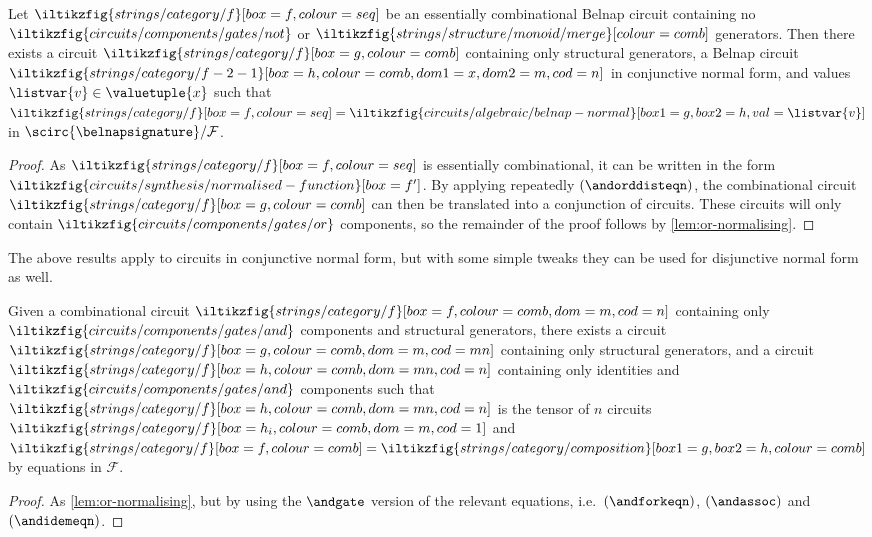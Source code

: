 \begin{proposition}\label{prop:conjunctive-normal-form}
    Let \(
    \iltikzfig{strings/category/f}[box=f,colour=seq]
    \) be an essentially combinational Belnap circuit containing no \(
    \iltikzfig{circuits/components/gates/not}
    \) or \(
    \iltikzfig{strings/structure/monoid/merge}[colour=comb]
    \) generators.
    Then there exists a circuit \(
    \iltikzfig{strings/category/f}[box=g,colour=comb]
    \) containing only structural generators, a Belnap circuit \(
    \iltikzfig{strings/category/f-2-1}[box=h,colour=comb,dom1=x,dom2=m,cod=n]
    \) in conjunctive normal form, and values \(\listvar{v} \in \valuetuple{x}\)
    such that \(
    \iltikzfig{strings/category/f}[box=f,colour=seq]
    =
    \iltikzfig{circuits/algebraic/belnap-normal}[box1=g,box2=h,val=\listvar{v}]
    \) in \(
    \scirc{\belnapsignature} / \mathcal{F}
    \).
\end{proposition}
\begin{proof}
    As \(
    \iltikzfig{strings/category/f}[box=f,colour=seq]
    \) is essentially combinational, it can be written in the form \(
    \iltikzfig{circuits/synthesis/normalised-function}[box=f^\prime]
    \).
    By applying repeatedly \((\andorddisteqn)\), the combinational circuit \(
    \iltikzfig{strings/category/f}[box=g,colour=comb]
    \) can then be translated into a conjunction of circuits.
    These circuits will only contain \(
    \iltikzfig{circuits/components/gates/or}
    \) components, so the remainder of the proof follows by
    \cref{lem:or-normalising}.
\end{proof}

The above results apply to circuits in conjunctive normal form, but with some
simple tweaks they can be used for disjunctive normal form as well.

\begin{lemma}\label{lem:and-normalising}
    Given a combinational circuit \(
    \iltikzfig{strings/category/f}[box=f,colour=comb,dom=m,cod=n]
    \) containing only \(
    \iltikzfig{circuits/components/gates/and}
    \) components and structural generators, there exists a circuit
    \(
    \iltikzfig{strings/category/f}[box=g,colour=comb,dom=m,cod=mn]
    \) containing only structural generators, and a circuit
    \(
    \iltikzfig{strings/category/f}[box=h,colour=comb,dom=mn,cod=n]
    \) containing only identities and \(
    \iltikzfig{circuits/components/gates/and}
    \) components such that \(
    \iltikzfig{strings/category/f}[box=h,colour=comb,dom=mn,cod=n]
    \) is the tensor of \(n\) circuits \(
    \iltikzfig{strings/category/f}[box=h_i,colour=comb,dom=m,cod=1]
    \) and \(
    \iltikzfig{strings/category/f}[box=f,colour=comb]
    =
    \iltikzfig{strings/category/composition}[box1=g,box2=h,colour=comb]
    \) by equations in \(\mathcal{F}\).
\end{lemma}
\begin{proof}
    As \cref{lem:or-normalising}, but by using the \(\andgate\) version of the
    relevant equations, i.e.\ \((\andforkeqn)\), \((\andassoc)\) and \((\andidemeqn)\).
\end{proof}

